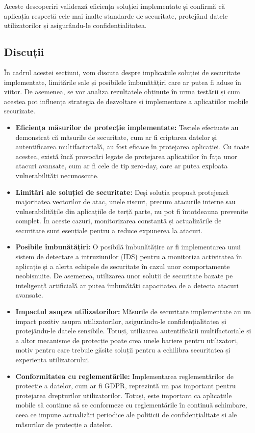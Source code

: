 \documentclass[runningheads]{llncs}
\begin{document}
Aceste descoperiri validează eficiența soluției implementate și confirmă că aplicația respectă cele mai înalte standarde de securitate, protejând datele utilizatorilor și asigurându-le confidențialitatea.

\subsection{Discuții}
În cadrul acestei secțiuni, vom discuta despre implicațiile soluției de securitate implementate, limitările sale și posibilele îmbunătățiri care ar putea fi aduse în viitor. De asemenea, se vor analiza rezultatele obținute în urma testării și cum acestea pot influența strategia de dezvoltare și implementare a aplicațiilor mobile securizate.

\begin{itemize}
  \item \textbf{Eficiența măsurilor de protecție implementate:}  
  Testele efectuate au demonstrat că măsurile de securitate, cum ar fi criptarea datelor și autentificarea multifactorială, au fost eficace în protejarea aplicației. Cu toate acestea, există încă provocări legate de protejarea aplicațiilor în fața unor atacuri avansate, cum ar fi cele de tip zero-day, care ar putea exploata vulnerabilități necunoscute.
  
  \item \textbf{Limitări ale soluției de securitate:}  
  Deși soluția propusă protejează majoritatea vectorilor de atac, unele riscuri, precum atacurile interne sau vulnerabilitățile din aplicațiile de terță parte, nu pot fi întotdeauna prevenite complet. În aceste cazuri, monitorizarea constantă și actualizările de securitate sunt esențiale pentru a reduce expunerea la atacuri.
  
  \item \textbf{Posibile îmbunătățiri:}  
  O posibilă îmbunătățire ar fi implementarea unui sistem de detectare a intruziunilor (IDS) pentru a monitoriza activitatea în aplicație și a alerta echipele de securitate în cazul unor comportamente neobișnuite. De asemenea, utilizarea unor soluții de securitate bazate pe inteligență artificială ar putea îmbunătăți capacitatea de a detecta atacuri avansate.
  
  \item \textbf{Impactul asupra utilizatorilor:}  
  Măsurile de securitate implementate au un impact pozitiv asupra utilizatorilor, asigurându-le confidențialitatea și protejându-le datele sensibile. Totuși, utilizarea autentificării multifactoriale și a altor mecanisme de protecție poate crea unele bariere pentru utilizatori, motiv pentru care trebuie găsite soluții pentru a echilibra securitatea și experiența utilizatorului.
  
  \item \textbf{Conformitatea cu reglementările:}  
  Implementarea reglementărilor de protecție a datelor, cum ar fi GDPR, reprezintă un pas important pentru protejarea drepturilor utilizatorilor. Totuși, este important ca aplicațiile mobile să continue să se conformeze cu reglementările în continuă schimbare, ceea ce impune actualizări periodice ale politicii de confidențialitate și ale măsurilor de protecție a datelor.
\end{itemize}
\end{document}

